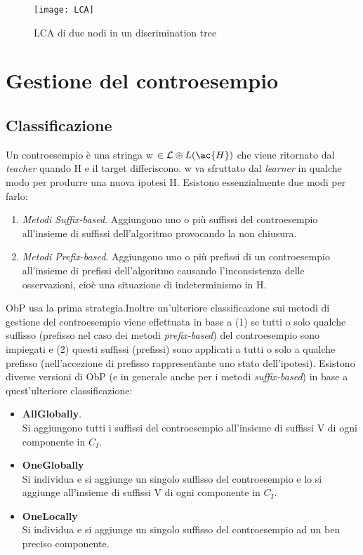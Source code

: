 \begin{figure}[htp]
	\centering
	\texttt{[image: LCA]}
	\caption[LCA di due nodi]{LCA di due nodi in un discrimination tree}
   \label{fig:lca}
\end{figure}
\section[Gestione Controesempio]{Gestione del controesempio}

\subsection{Classificazione}
\label{sub:cla}
Un controesempio è una stringa  w $\in \mathcal{L} \oplus L(\ac{H})$ che viene ritornato dal \textit{teacher} quando \ac{H} e il target differiscono. w va sfruttato dal \textit{learner} in qualche modo per produrre una nuova ipotesi \ac{H}. Esistono essenzialmente due modi per farlo: 
\begin{enumerate}
\item \textit{Metodi Suffix-based}. Aggiungono uno o più suffissi del controesempio all'insieme di suffissi dell'algoritmo provocando la non chiusura.
\item \textit{Metodi Prefix-based}. Aggiungono uno o più prefissi di un controesempio all'insieme di prefissi dell'algoritmo causando l'inconsistenza delle osservazioni, cioè una situazione di indeterminismo in \ac{H}.
\end{enumerate}
\ac{ObP} usa la prima strategia.Inoltre un'ulteriore classificazione sui metodi di gestione del controesempio viene effettuata in base a (1) se tutti o solo qualche suffisso (prefisso nel caso dei metodi \textit{prefix-based}) del controesempio sono impiegati e (2) questi suffissi (prefissi) sono applicati a tutti o solo a qualche prefisso (nell'accezione di prefisso rappresentante uno stato dell'ipotesi). Esistono diverse versioni di \ac{ObP} (e in generale anche per i metodi \textit{suffix-based}) in base  a quest'ulteriore classificazione:
\begin{itemize}
\item \textbf{AllGlobally}.\\Si aggiungono tutti i suffissi del controesempio all'insieme di suffissi V di ogni componente in $C_I$.
\item \textbf{OneGlobally}\\Si individua e si aggiunge un singolo suffisso del controesempio e lo si aggiunge all'insieme di suffissi V di ogni componente in $C_I$.
\item \textbf{OneLocally}\\Si individua e si aggiunge un singolo suffisso del controesempio ad un ben preciso componente.
\end{itemize}
